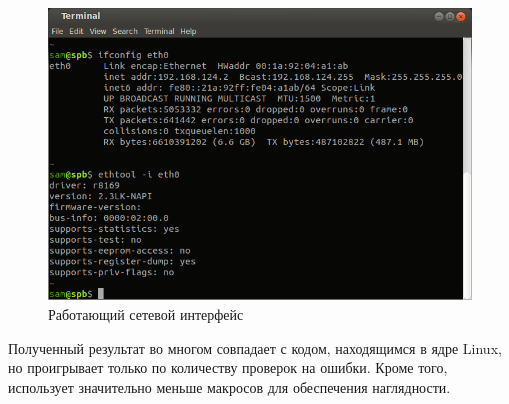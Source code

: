 \begin{figure}[h!]
\centering
\includegraphics[scale=0.7]{res/pic02}
\caption{Работающий сетевой интерфейс}
\end{figure}

Полученный результат во многом совпадает с кодом, находящимся в ядре Linux, но проигрывает только по количеству проверок на ошибки. Кроме того, использует значительно меньше макросов для обеспечения наглядности.